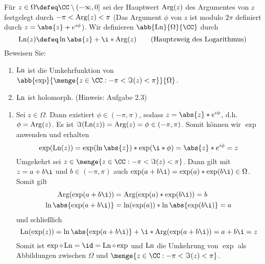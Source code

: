 \begin{exercisePage}
	
	
	
	\begin{task}
		Für $z \in \Omega \defeq \CC \setminus (-\infty, 0]$ sei der Hauptwert $\operatorname{Arg}(z)$ des Argumentes von $z$ festgelegt durch $- \pi < \operatorname{Arg}(z) < \pi$ (Das Argument $\phi$ von $z$ ist modulo $2\pi$ definiert durch $z = \abs{z} + e^{i\phi}$). Wir definieren $\abb{\Ln}{\Omega}{\CC}$ durch
		\begin{equation}
			\Ln(z) \defeq \ln\abs{z} + \i * \Arg(z) \tag{Hauptzweig des Logarithmus}
		\end{equation}
		Beweisen Sie:
		\begin{enumerate}
			\item $\operatorname{Ln}$ ist die Umkehrfunktion von $\abb{\exp}{\menge{z \in \CC : - \pi < \Im(z) < \pi}}{\Omega}$.
			\item $\operatorname{Ln}$ ist holomorph. (Hinweis: Aufgabe 2.3)
		\end{enumerate}
	\end{task}

	\begin{enumerate}[label=(zu \alph*), leftmargin=*]
		\item Sei $z \in \Omega$. Dann existiert $\phi \in (-\pi,\pi)$, sodass $z = \abs{z} * e^{i\phi}$, d.h. $\phi = \operatorname{Arg}(z)$. Es ist $\Im(\operatorname{Ln}(z)) = \operatorname{Arg}(z) = \phi \in (-\pi, \pi)$. Somit können wir $\exp$ anwenden und erhalten
		\begin{equation*}
			\exp(\Ln(z)) = \exp(\ln \abs{z}) * \exp(\i * \phi) = \abs{z} * e^{i \phi} = z
		\end{equation*} 
		Umgekehrt sei $z \in \menge{z \in \CC : -\pi < \Im(z) < \pi}$. Dann gilt mit $z = a + b \i$ und $b \in (-\pi, \pi)$ auch $\exp(a + b \i) = \exp(a) * \exp(b \i) \in \Omega$. Somit gilt
		\begin{equation*}
			\begin{aligned}
				\Arg(\exp(a + b \i)) &= \Arg( \exp(a) * \exp(b \i) ) = b \\
				\ln \abs{\exp(a + b \i)} &= \ln(\exp(a)) * \ln \abs{\exp(b \i)} = a
			\end{aligned}
		\end{equation*}
		und schließlich
		\begin{equation*}
			\Ln(\exp(z)) = \ln \abs{\exp(a + b \i)} + \i * \Arg(\exp(a + b \i)) = a + b \i = z
		\end{equation*}
		Somit ist $\exp \circ \Ln = \id = \Ln \circ \exp$ und $\operatorname{Ln}$ die Umkehrung von $\exp$ als Abbildungen zwischen $\Omega$ und $\menge{z \in \CC : - \pi < \Im(z) < \pi}$.
		

\end{enumerate}
\end{exercisePage}
